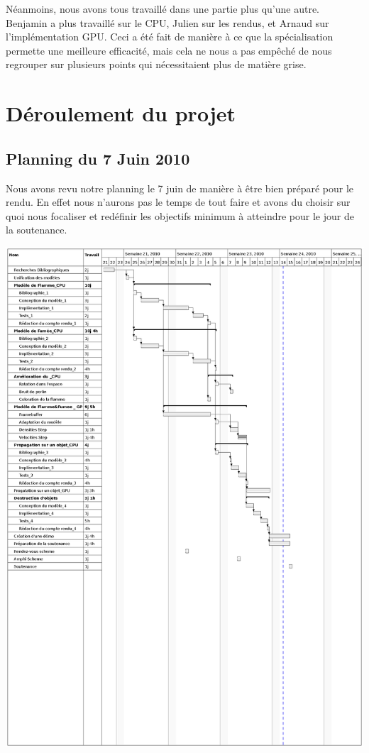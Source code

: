 \documentclass[a4paper,10pt]{article}
\begin{document}
Néanmoins, nous avons tous travaillé dans une partie plus qu'une autre.
Benjamin a plus travaillé sur le CPU, Julien sur les rendus, et Arnaud sur l'implémentation GPU.
Ceci a été fait de manière à ce que la spécialisation permette une meilleure efficacité, mais cela ne nous
a pas empêché de nous regrouper sur plusieurs points qui nécessitaient plus de matière grise.

\section{Déroulement du projet}
\subsection{Planning du 7 Juin 2010}

    Nous avons revu notre planning le 7 juin de manière à être bien préparé pour le rendu.
    En effet nous n'aurons pas le temps de tout faire et avons du choisir sur quoi nous
    focaliser et redéfinir les objectifs minimum à atteindre pour le jour de la soutenance.

        \includegraphics[scale=0.8]{../Planning/GANTT2.ps}
        
\end{document}
